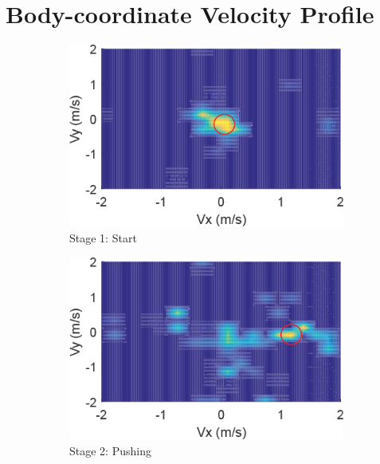 \section{Body-coordinate Velocity Profile}\label{sec:background-bvp}

\begin{figure}[t]
	\centering
	\begin{subfigure}{0.22\textwidth}
		\centering
		\includegraphics[width=\textwidth]{figures/bvp_stage_1_start}
		\caption{Stage 1: Start}
	\end{subfigure}
	\hfill
	\begin{subfigure}{0.22\textwidth}
		\centering
		\includegraphics[width=\textwidth]{figures/bvp_stage_2_pushing}
		\caption{Stage 2: Pushing}
	\end{subfigure}
	\hfill
	\begin{subfigure}{0.22\textwidth}
		\centering

\end{subfigure}
\end{figure}
